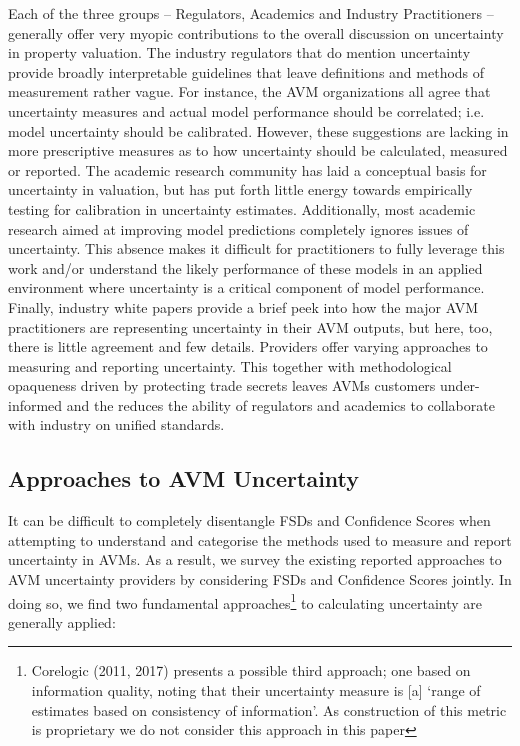 \documentclass[colTwo]{anon}
\theoremstyle{definition}
\begin{document}
Each of the three groups -- Regulators, Academics and Industry Practitioners -- generally offer very myopic contributions to the overall discussion on uncertainty in property valuation. The industry regulators that do mention uncertainty provide broadly interpretable guidelines that leave definitions and methods of measurement rather vague.  For instance, the AVM organizations all agree that uncertainty measures and actual model performance should be correlated; i.e. model uncertainty should be calibrated.  However, these suggestions are lacking in more prescriptive measures as to how uncertainty should be calculated, measured or reported.  The academic research community has laid a conceptual basis for uncertainty in valuation, but has put forth little energy towards empirically testing for calibration in uncertainty estimates. Additionally, most academic research aimed at improving model predictions completely ignores issues of uncertainty.  This absence makes it difficult for practitioners to fully leverage this work and/or understand the likely performance of these models in an applied environment where uncertainty is a critical component of model performance.  Finally, industry white papers provide a brief peek into how the major AVM practitioners are representing uncertainty in their AVM outputs, but here, too, there is little agreement and few details. Providers offer varying approaches to measuring and reporting uncertainty. This together with methodological opaqueness driven by protecting trade secrets leaves AVMs customers under-informed and the reduces the ability of regulators and academics to collaborate with industry on unified standards.

\subsection{Approaches to AVM Uncertainty}

It can be difficult to completely disentangle FSDs and Confidence Scores when attempting to understand and categorise the methods used to measure and report uncertainty in AVMs.  As a result, we survey the existing reported approaches to AVM uncertainty providers by considering FSDs and Confidence Scores jointly.  In doing so, we find two fundamental approaches\footnote{Corelogic (2011, 2017) presents a possible third approach; one based on information quality, noting that their uncertainty measure is [a] ‘range of estimates based on consistency of information’. As construction of this metric is proprietary we do not consider this approach in this paper} to calculating uncertainty are generally applied:
\end{document}
